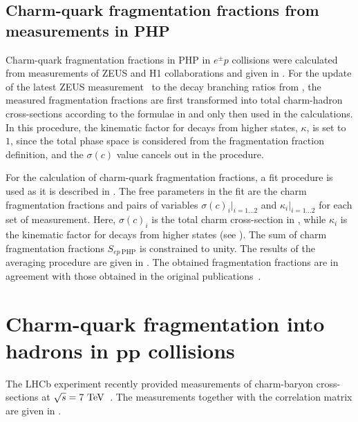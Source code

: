 \subsection{Charm-quark fragmentation fractions from measurements in 
PHP}
Charm-quark fragmentation fractions in PHP in $e^{\pm}p$ collisions
 were calculated from measurements of  ZEUS and H1
            collaborations and given in .
\FloatBarrier
\tabPHPmeas
%
For the update of the latest ZEUS measurement~\cite{Abramowicz:2013eja} 
to the  decay branching ratios from , the measured 
fragmentation fractions are first transformed into total charm-hadron 
cross-sections according to the formulae in  and only 
then used in the calculations. In this procedure, the kinematic factor 
for decays from higher states, $\kappa$, is set to $1$, since  the total 
phase space is considered from the fragmentation fraction definition, 
and the $\sigma(c)$ value cancels out in the procedure.
%

%
For the calculation of charm-quark fragmentation fractions, a fit 
procedure is used as it is described in .
The free parameters in the fit are the charm fragmentation fractions
and  pairs  of variables $\sigma(c)_{i}|_{i=1 \dots 2}$ and 
$\kappa_{i}|_{i=1 \dots 2}$ for each set of measurement. 
%
Here, $\sigma(c)_{i}$ is the total charm cross-section in \ep, while 
$\kappa_{i}$ is the kinematic factor for decays from higher states 
(see ). 
%
The sum of charm fragmentation fractions $S_{ep~\text{PHP}}$ is 
constrained to unity.
%
The results of the averaging procedure are given in .
%
The obtained fragmentation fractions are in agreement with those 
obtained in the original publications~\cite{Chekanov:2005mm,
Abramowicz:2013eja}.
%
\FloatBarrier
\tabPHPaverage
%

\FloatBarrier
\section{Charm-quark fragmentation into hadrons in 
${\pmb {pp}}$ collisions}
\label{sec:ffpp}

The LHCb experiment recently provided  measurements of charm-baryon 
cross-sections at $\sqrt{s}=7~{\text{Te}\kern-0.06667em\text{V\/}}$~\cite{Aaij:2013mga}. 
%
The measurements together with the correlation matrix are given in 
.
%
\FloatBarrier
\tabLHCBmeas
%

